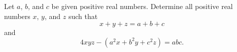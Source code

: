 Let $a$, $b$, and $c$ be given positive real numbers. Determine all positive real numbers $x$, $y$, and $z$ such that
\[ x + y + z = a + b + c \]
and
\[ 4xyz - (a^2 x + b^2 y + c^2 z) = abc. \]
